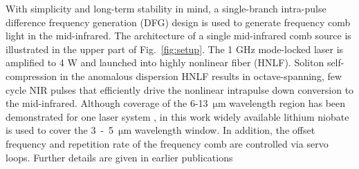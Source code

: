 \documentclass[aip,reprint]{revtex4-1}
\begin{document}
With simplicity and long-term stability in mind, a single-branch intra-pulse difference frequency generation (DFG) design is used to generate frequency comb light in the mid-infrared\cite{lindMidInfraredFrequencyComb2020,kowligyMidinfraredFrequencyCombs2020,hoghooghiBroadband1GHzMidinfrared2022}. 
% 
%
The architecture of a single mid-infrared comb source is illustrated in the upper part of \mbox{Fig. \ref{fig:setup}}. The 1 GHz mode-locked laser is amplified to 4 W and launched into highly nonlinear fiber (HNLF). Soliton self-compression in the anomalous dispersion HNLF results in octave-spanning, few cycle NIR pulses that efficiently drive the nonlinear intrapulse down conversion to the mid-infrared. Although coverage of the \mbox{6-13 $\mathrm{\mu m}$} wavelength region has been demonstrated for one laser system \cite{hoghooghiBroadband1GHzMidinfrared2022}, in this work widely available lithium niobate is used to cover the \mbox{3 - 5 $\mathrm{\mu m}$} wavelength window. In addition, the offset frequency and repetition rate of the frequency comb are controlled via servo loops. Further details  are given in earlier publications \cite{hoghooghiBroadband1GHzMidinfrared2022,hoghooghiGHzRepetitionRate2024}
\end{document}
